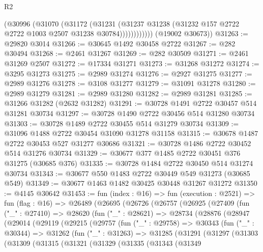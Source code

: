 \begin{lexlean}{R2}
\begin{coremodule}
                  (@30996
                    (@31070
                      (@31172
                        (@31231
                          (@31237
                            @31238
                            (@31232 @157 @2722 @2722 @1003 @2507 @31238 @30784))))))))))))
      (@19002 @30673))
@31263 := @29820 @3014
@31266 := @30645 @1492 @30458 @2722
@31267 := @282 @30494
@31268 := @2461 @31267
@31269 := @282 @30509
@31271 := @2461 @31269 @2507
@31272 := @17334 @31271
@31273 := @31268 @31272
@31274 := @3295 @31273
@31275 := @2989 @31274
@31276 := @2927 @31275
@31277 := @2989 @31276
@31278 := @3108 @31277
@31279 := @31091 @31278
@31280 := @2989 @31279
@31281 := @2989 @31280
@31282 := @2989 @31281
@31285 := @31266 @31282 (@2632 @31282)
@31291 := @30728 @1491 @2722 @30457 @514 @31281 @30734
@31297 := @30728 @1490 @2722 @30456 @514 @31280 @30734
@31303 := @30728 @1489 @2722 @30455 @514 @31279 @30734
@31309 := @31096 @1488 @2722 @30454 @31090 @31278 @31158
@31315 := @30678 @1487 @2722 @30453 @527 @31277 @30686
@31321 := @30728 @1486 @2722 @30452 @514 @31276 @30734
@31329 := @30677 @377 @1485 @2722 @30451 @376 @31275 (@30685 @376)
@31335 := @30728 @1484 @2722 @30450 @514 @31274 @30734
@31343 := @30677 @550 @1483 @2722 @30449 @549 @31273 (@30685 @549)
@31349 := @30677 @1463 @1482 @30425 @30448 @31267 @31272
@31350 := @4145 @30642
@31453 := fun (index : @16) =>
  fun (execution : @2521) =>
  fun (flag : @16) =>
  @26489
    (@26695
      (@26726
        (@26757
          (@26925
            (@27409
              (fun ("_" : @27410) =>
              @28620
                (fun ("_" : @28621) =>
                @28734
                  (@28876
                    (@28947
                      (@29014
                        (@29119
                          (@29215
                            (@29757
                              (fun ("_" : @29758) =>
                              @30343
                                (fun ("_" : @30344) =>
                                @31262
                                  (fun ("_" : @31263) =>
                                  @31285
                                    (@31291
                                      (@31297
                                        (@31303
                                          (@31309
                                            (@31315
                                              (@31321
                                                (@31329
                                                  (@31335
                                                    (@31343
                                                      (@31349

\end{coremodule}
\end{lexlean}
